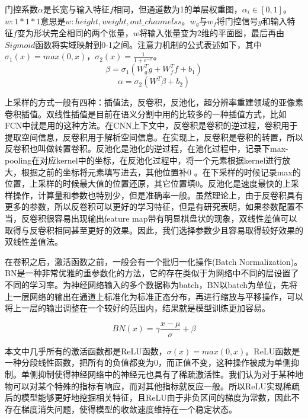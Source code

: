 \documentclass[UTF8]{ctexart}
\begin{document}
门控系数$\alpha$是长宽与输入特征$f$相同，但通道数为1的单层权重图，$\alpha_i\in[0,1]$。$w:1*1*1$意思是$w:height,weight,out\_channelss$。$w_g$与$w_f$将门控信号$g$和输入特征$f$变为形状完全相同的两个张量，$w$将输入张量变为2维的平面图，最后再由$Sigmoid$函数将实域映射到0-1之间。注意力机制的公式表述如下，其中$\sigma_1(x)=max(0,x)$，$\sigma_2(x)=\frac{1}{1+e^{-x}}$。
\begin{equation}
    \beta = \sigma_1(W_g^Tg+W_f^Tf+b_1)
\end{equation}
\begin{equation}
    \alpha = \sigma_2(W^T\beta+b_2)
\end{equation}

上采样的方式一般有四种：插值法，反卷积，反池化，超分辨率重建领域的亚像素卷积插值。双线性插值是目前在语义分割中用的比较多的一种插值方式，比如FCN中就是用的这种方法。在CNN上下文中，反卷积是卷积的逆过程，卷积用于提取空间信息，反卷积用于解析空间信息。在实现上，反卷积是卷积的转置，所以反卷积也叫做转置卷积。反池化是池化的逆过程，在池化过程中，记录下max-pooling在对应kernel中的坐标，在反池化过程中，将一个元素根据kernel进行放大，根据之前的坐标将元素填写进去，其他位置补0 。在下采样的时候记录max的位置，上采样的时候最大值的位置还原，其它位置填0。反池化是速度最快的上采样操作，计算量和参数也特别少，但是准确率一般。虽然理论上，由于反卷积具有更多的参数，所以反卷积可以更好的学习特征，但是有研究表明，如果参数配置不当，反卷积很容易出现输出feature map带有明显棋盘状的现象\cite{odena2016deconvolution}，双线性差值可以取得与反卷积相同甚至更好的效果。因此，我们选择参数少且容易取得较好效果的双线性差值法。


在卷积之后，激活函数之前，一般会有一个批归一化操作\cite{ioffe2015batch}(Batch Normalization)。BN是一种非常优雅的重参数化的方法，它的存在类似于为网络中不同的层设置了不同的学习率。为神经网络输入的多个数据称为batch，BN以batch为单位，先将上一层网络的输出在通道上标准化为标准正态分布，再进行缩放与平移操作，可以将上一层的输出调整在一个较好的范围内，结果就是模型训练更加容易。

\begin{equation}
    BN(x) = \gamma\frac{x-\mu}{\sigma}+\beta
\end{equation}

本文中几乎所有的激活函数都是ReLU函数，$\sigma(x)=max(0,x)$。ReLU函数是一种分段线性函数，把所有的负值都变为0，而正值不变，这种操作被成为单侧抑制。单侧抑制使得神经网络中的神经元也具有了稀疏激活性。我们认为对于某种地物可以对某个特殊的指标有响应，而对其他指标就反应一般。所以ReLU实现稀疏后的模型能够更好地挖掘相关特征，且ReLU由于非负区间的梯度为常数，因此不存在梯度消失问题，使得模型的收敛速度维持在一个稳定状态。
\end{document}

